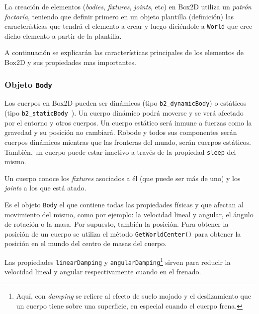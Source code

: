 La creación de elementos (\emph{bodies}, \emph{fixtures}, \emph{joints}, etc) en Box2D utiliza un \emph{patrón factoría}, teniendo que definir primero en un objeto plantilla (definición) las características que tendrá el elemento a crear y luego diciéndole a \texttt{World} que cree dicho elemento a partir de la plantilla.

A continuación se explicarán las características principales de los elementos de Box2D y sus propiedades mas importantes.

\subsubsection*{Objeto \texttt{Body}}

Los cuerpos en Box2D pueden ser dinámicos (tipo \texttt{b2\_dynamicBody}) o estáticos (tipo \texttt{b2\_staticBody }). Un cuerpo dinámico podrá moverse y se verá afectado por el entorno y otros cuerpos. Un cuerpo estático será inmune a fuerzas como la gravedad y su posición no cambiará. Robode y todos sus componentes serán cuerpos dinámicos mientras que las fronteras del mundo, serán cuerpos estáticos. También, un cuerpo puede estar inactivo a través de la propiedad \texttt{sleep} del mismo.

Un cuerpo conoce los \emph{fixtures} asociados a él (que puede ser más de uno) y los \emph{joints} a los que está atado.

Es el objeto \texttt{Body} el que contiene todas las propiedades físicas y que afectan al movimiento del mismo, como por ejemplo: la velocidad lineal y angular, el ángulo de rotación o la masa. Por supuesto, también la posición. Para obtener la posición de un cuerpo se utiliza el método \texttt{GetWorldCenter()} para obtener la posición en el mundo del centro de masas del cuerpo.


Las propiedades \texttt{linearDamping} y \texttt{angularDamping}\footnote{Aquí, con \emph{damping} se refiere al efecto de suelo mojado y el deslizamiento que un cuerpo tiene sobre una superficie, en especial cuando el cuerpo frena.} sirven para reducir la velocidad lineal y angular respectivamente cuando en el frenado.



